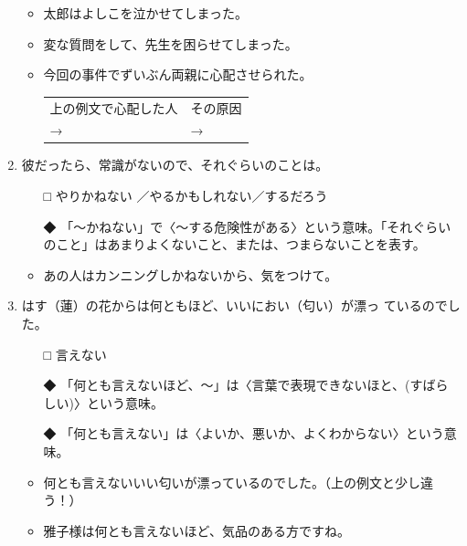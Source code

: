 \documentclass[
uplatex,
b5paper,
10pt,
dvipdfmx
]{jsbook}
\begin{document}
\begin{enumerate}
\begin{itemize}
\item 太郎はよしこを泣かせてしまった。
\item 変な質問をして、先生を困らせてしまった。
\end{itemize}
\begin{itemize}
\item 今回の事件でずいぶん両親に心配させられた。

\begin{tabular}[t]{p{4cm}p{4cm}}
\rule{0mm}{0mm} 上の例文で心配した人  & その原因 \\
\rule{0mm}{4mm} →                    & →       \\
\end{tabular}
\end{itemize}
\vspace{1\baselineskip}
      
\item 彼だったら、常識がないので、それぐらいのことは\underline{\hspace{3zw}}。

\begin{itemize}
\item[□] やりかねない ／やるかもしれない／するだろう
\item[◆] 「〜かねない」で〈〜する危険性がある〉という意味。「それぐらい
	  のこと」はあまりよくないこと、または、つまらないことを表す。
\end{itemize}
\begin{itemize}
\item あの人はカンニングしかねないから、気をつけて。
\end{itemize}

\item はす（蓮）の花からは何とも\underline{\hspace{3zw}}ほど、いいにおい（匂い）が漂っ
      ているのでした。

\begin{itemize}
\item[□] 言えない
\item[◆] 「何とも言えないほど、〜」は〈言葉で表現できないほと、(すばら
	  しい)〉という意味。
\item[◆] 「何とも言えない」は〈よいか、悪いか、よくわからない〉という意
	  味。
\end{itemize}

\begin{itemize}
\item 何とも言えないいい匂いが漂っているのでした。（上の例文と少し違う！）
\item 雅子様は何とも言えないほど、気品のある方ですね。
\end{itemize}
\end{enumerate}
\end{document}
